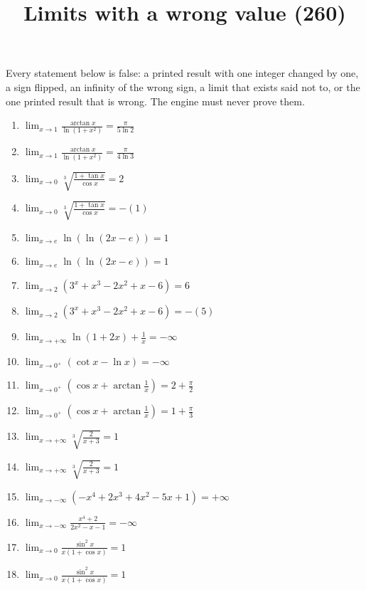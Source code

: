 \documentclass[11pt,a4paper]{article}
\title{Limits with a wrong value (260)}
\author{}
\date{}
\begin{document}
\maketitle
Every statement below is false: a printed result with one integer changed by one, a sign flipped, an infinity of the wrong sign, a limit that exists said not to, or the one printed result that is wrong. The engine must never prove them.

\begin{enumerate}
\item $\displaystyle \lim_{x \to 1} \frac{\arctan x}{\ln(1 + x^{2})} = \frac{\pi}{5\ln 2}$
\item $\displaystyle \lim_{x \to 1} \frac{\arctan x}{\ln(1 + x^{2})} = \frac{\pi}{4\ln 3}$
\item $\displaystyle \lim_{x \to 0} \sqrt[3]{\frac{1 + \tan x}{\cos x}} = 2$
\item $\displaystyle \lim_{x \to 0} \sqrt[3]{\frac{1 + \tan x}{\cos x}} = -\left(1\right)$
\item $\displaystyle \lim_{x \to e} \ln\left(\ln(2x - e)\right) = 1$
\item $\displaystyle \lim_{x \to e} \ln\left(\ln(2x - e)\right) = 1$
\item $\displaystyle \lim_{x \to 2} (3^{x} + x^{3} - 2x^{2} + x - 6) = 6$
\item $\displaystyle \lim_{x \to 2} (3^{x} + x^{3} - 2x^{2} + x - 6) = -\left(5\right)$
\item $\displaystyle \lim_{x \to +\infty} \ln(1 + 2x) + \frac{1}{x} = -\infty$
\item $\displaystyle \lim_{x \to 0^{+}} (\cot x - \ln x) = -\infty$
\item $\displaystyle \lim_{x \to 0^{+}} \left(\cos x + \arctan\frac{1}{x}\right) = 2 + \frac{\pi}{2}$
\item $\displaystyle \lim_{x \to 0^{+}} \left(\cos x + \arctan\frac{1}{x}\right) = 1 + \frac{\pi}{3}$
\item $\displaystyle \lim_{x \to +\infty} \sqrt[3]{\frac{2}{x + 3}} = 1$
\item $\displaystyle \lim_{x \to +\infty} \sqrt[3]{\frac{2}{x + 3}} = 1$
\item $\displaystyle \lim_{x \to -\infty} (-x^{4} + 2x^{3} + 4x^{2} - 5x + 1) = +\infty$
\item $\displaystyle \lim_{x \to -\infty} \frac{x^{4} + 2}{2x^{2} - x - 1} = -\infty$
\item $\displaystyle \lim_{x \to 0} \frac{\sin^{2} x}{x(1 + \cos x)} = 1$
\item $\displaystyle \lim_{x \to 0} \frac{\sin^{2} x}{x(1 + \cos x)} = 1$

\end{enumerate}
\end{document}
